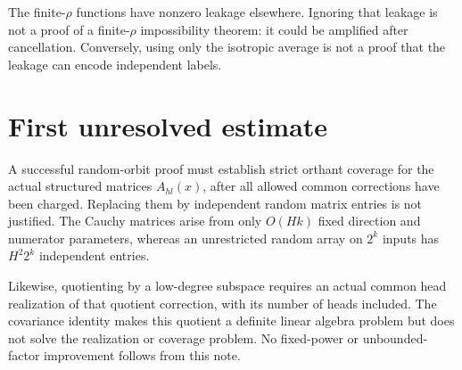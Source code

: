 \documentclass[11pt]{article}
\begin{document}
The finite-$\rho$ functions have nonzero leakage elsewhere. Ignoring that
leakage is not a proof of a finite-$\rho$ impossibility theorem: it could
be amplified after cancellation. Conversely, using only the isotropic
average is not a proof that the leakage can encode independent labels.

\section{First unresolved estimate}

A successful random-orbit proof must establish strict orthant coverage
for the actual structured matrices $A_{hl}(x)$, after all allowed common
corrections have been charged. Replacing them by independent random
matrix entries is not justified. The Cauchy matrices arise from only
$O(Hk)$ fixed direction and numerator parameters, whereas an unrestricted
random array on $2^k$ inputs has $H^2 2^k$ independent entries.

Likewise, quotienting by a low-degree subspace requires an actual common
head realization of that quotient correction, with its number of heads
included. The covariance identity makes this quotient a definite linear
algebra problem but does not solve the realization or coverage problem.
No fixed-power or unbounded-factor improvement follows from this note.
\end{document}
